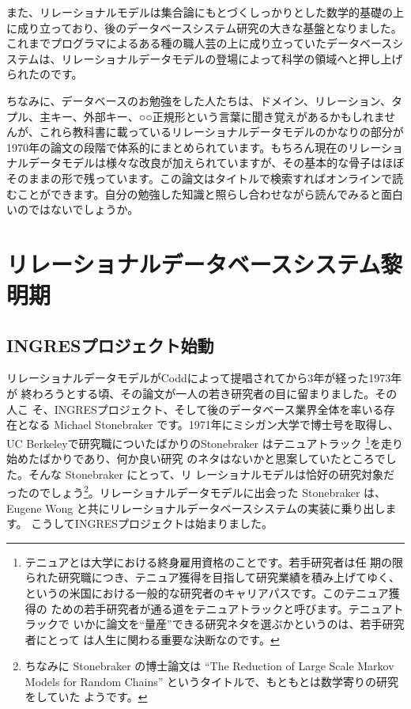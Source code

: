 また、リレーショナルモデルは集合論にもとづくしっかりとした数学的基礎の上
に成り立っており、後のデータベースシステム研究の大きな基盤となりました。
これまでプログラマによるある種の職人芸の上に成り立っていたデータベースシ
ステムは、リレーショナルデータモデルの登場によって科学の領域へと押し上げ
られたのです。

ちなみに、データベースのお勉強をした人たちは、ドメイン、リレーション、タ
プル、主キー、外部キー、○○正規形という言葉に聞き覚えがあるかもしれませ
んが、これら教科書に載っているリレーショナルデータモデルのかなりの部分が
1970年の論文の段階で体系的にまとめられています。もちろん現在のリレーショ
ナルデータモデルは様々な改良が加えられていますが、その基本的な骨子はほぼ
そのままの形で残っています。この論文はタイトルで検索すればオンラインで読
むことができます。自分の勉強した知識と照らし合わせながら読んでみると面白
いのではないでしょうか。

\section{リレーショナルデータベースシステム黎明期}

\subsection{INGRESプロジェクト始動}

リレーショナルデータモデルがCoddによって提唱されてから3年が経った1973年が
終わろうとする頃、その論文が一人の若き研究者の目に留まりました。その人こ
そ、INGRESプロジェクト、そして後のデータベース業界全体を率いる存在となる
Michael Stonebraker です。1971年にミシガン大学で博士号を取得し、UC
Berkeleyで研究職についたばかりのStonebraker はテニュアトラック
\footnote{テニュアとは大学における終身雇用資格のことです。若手研究者は任
期の限られた研究職につき、テニュア獲得を目指して研究業績を積み上げてゆく、
というの米国における一般的な研究者のキャリアパスです。このテニュア獲得の
ための若手研究者が通る道をテニュアトラックと呼びます。テニュアトラックで
いかに論文を``量産''できる研究ネタを選ぶかというのは、若手研究者にとって
は人生に関わる重要な決断なのです。}を走り始めたばかりであり、何か良い研究
のネタはないかと思案していたところでした。そんな Stonebraker にとって、リ
レーショナルモデルは恰好の研究対象だったのでしょう\footnote{ちなみに
Stonebraker の博士論文は ``The Reduction of Large Scale Markov Models
for Random Chains'' というタイトルで、もともとは数学寄りの研究をしていた
ようです。 }。リレーショナルデータモデルに出会った Stonebraker は、
Eugene Wong と共にリレーショナルデータベースシステムの実装に乗り出します。
こうしてINGRESプロジェクトは始まりました。

